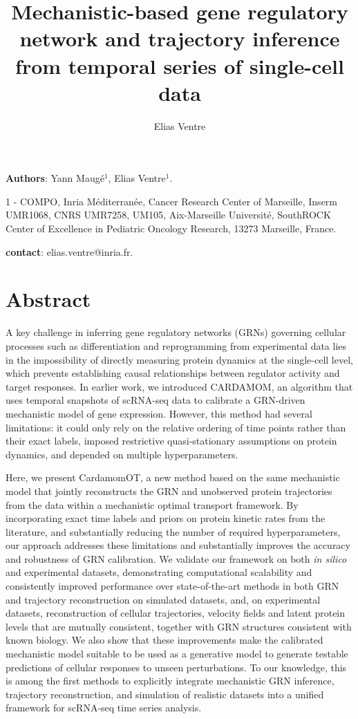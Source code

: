 \documentclass[a4paper, 11pt]{article}
\title{Mechanistic-based gene regulatory network and trajectory inference from temporal series of single-cell data}
\author{Elias Ventre}
\theoremstyle{plain}
\theoremstyle{remark}
\newcommand*{\firstreview}[1]{{\color{black}#1}}
\begin{document}
\setlength\parindent{0pt}
\begin{center}
\end{center}
    \vspace{.5cm}
\noindent \textbf{Authors}: Yann Maugé$^{1}$, Elias Ventre$^{1}$.\par
1 - COMPO, Inria Méditerranée, Cancer Research Center of Marseille, Inserm UMR1068, CNRS UMR7258, UM105, Aix-Marseille Université, SouthROCK Center of Excellence in Pediatric Oncology Research, 13273 Marseille, France.
\par
\textbf{contact}: elias.ventre@inria.fr.

\linenumbers
\section*{Abstract}
A key challenge in inferring gene regulatory networks (GRNs) governing cellular processes such as differentiation and reprogramming from experimental data lies in the impossibility of directly measuring protein dynamics at the single-cell level, which prevents establishing causal relationships between regulator activity and target responses. In earlier work, we introduced CARDAMOM, an algorithm that uses temporal snapshots of scRNA-seq data to calibrate a GRN-driven mechanistic model of gene expression. However, this method had several limitations: it could only rely on the relative ordering of time points rather than their exact labels, imposed restrictive quasi-stationary assumptions on protein dynamics, and depended on multiple hyperparameters.

Here, we present CardamomOT, a new method based on the same mechanistic model that jointly reconstructs the GRN and unobserved protein trajectories from the data within a mechanistic optimal transport framework. By incorporating exact time labels and priors on protein kinetic rates from the literature, and substantially reducing the number of required hyperparameters, our approach addresses these limitations and substantially improves the accuracy and robustness of GRN calibration. We validate our framework on both \textit{in silico} and experimental datasets, demonstrating computational scalability and consistently improved performance over state-of-the-art methods in both GRN and trajectory reconstruction \firstreview{on simulated datasets, and, on experimental datasets, reconstruction of cellular trajectories, velocity fields and latent protein levels that are mutually consistent, together with GRN structures consistent with known biology}. We also show that these improvements make the calibrated mechanistic model suitable to be used as a generative model to generate testable predictions of cellular responses to unseen perturbations. To our knowledge, this is among the first methods to explicitly integrate mechanistic GRN inference, trajectory reconstruction, and simulation of realistic datasets into a unified framework for scRNA-seq time series analysis.
\end{document}

